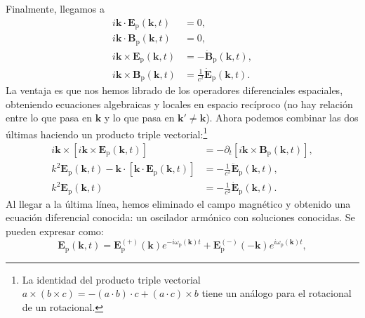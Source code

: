 Finalmente, llegamos a
\begin{subequations}
    \begin{align}
        i\mathbf{k}\cdot\mathbf{E}_\mathrm{p}(\mathbf{k}, t) &= 0,\\
        i\mathbf{k}\cdot\mathbf{B}_\mathrm{p}(\mathbf{k}, t) &= 0,\\
        i\mathbf{k}\times\mathbf{E}_\mathrm{p}(\mathbf{k}, t) &= -\dot {\mathbf{B}}_\mathrm{p}(\mathbf{k}, t),\\
        i\mathbf{k}\times\mathbf{B}_\mathrm{p}(\mathbf{k}, t) &= \frac{1}{c^2}\dot {\mathbf{E}}_\mathrm{p}(\mathbf{k}, t).
    \end{align}
\end{subequations}
La ventaja es que nos hemos librado de los operadores diferenciales espaciales, obteniendo ecuaciones algebraicas y locales en espacio recíproco (no hay relación entre lo que pasa en \(\mathbf{k}\) y lo que pasa en \(\mathbf{k}'\neq \mathbf{k}\)). Ahora podemos combinar las dos últimas haciendo un producto triple vectorial:\footnote{La identidad del producto triple vectorial \(a\times(b\times c) = -(a\cdot b)\cdot c + (a\cdot c)\times b\) tiene un análogo para el rotacional de un rotacional.} 
\begin{align}
    \nonumber
    i\mathbf{k}\times\left[i\mathbf{k}\times\mathbf{E}_\mathrm{p}(\mathbf{k}, t)\right] &= -\partial_t \left[i\mathbf{k}\times\mathbf{B}_\mathrm{p}(\mathbf{k}, t)\right],\\
    \nonumber
    k^2\mathbf{E}_\mathrm{p}(\mathbf{k}, t) - \mathbf{k}\cdot \left[\mathbf{k}\cdot\mathbf{E}_\mathrm{p}(\mathbf{k}, t)\right] &= -\frac{1}{c^2}\ddot{\mathbf{E}}_\mathrm{p}(\mathbf{k}, t),\\
    \label{eq.1-ondas-k}
    k^2\mathbf{E}_\mathrm{p}(\mathbf{k}, t) &= -\frac{1}{c^2}\dot{\mathbf{E}}_\mathrm{p}(\mathbf{k}, t).
\end{align}
Al llegar a la última línea, hemos eliminado el campo magnético y obtenido una ecuación diferencial conocida: un oscilador armónico con soluciones conocidas. Se pueden expresar como:
\begin{equation}
    \label{eq.1-Epkt_temporal}
    \mathbf{E}_\mathrm{p}(\mathbf{k}, t) = \mathbf{E}^{(+)}_\mathrm{p}(\mathbf{k}) e^{-i\omega_\mathrm{p}(\mathbf{k}) t} + \mathbf{E}^{(-)}_\mathrm{p}(-\mathbf{k}) e^{i\omega_\mathrm{p}(\mathbf{k}) t},
\end{equation}
